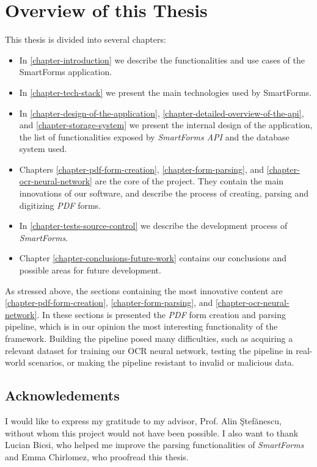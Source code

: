 \documentclass[11pt, a4paper]{report}
\begin{document}
\section{Overview of this Thesis}

This thesis is divided into several chapters:
\begin{itemize}
	\item In \autoref{chapter-introduction} we describe the functionalities and use cases of the SmartForms application.
	\item In \autoref{chapter-tech-stack} we present the main technologies used by SmartForms.
	\item In \autoref{chapter-design-of-the-application}, \autoref{chapter-detailed-overview-of-the-api}, and \autoref{chapter-storage-system} we present the internal design of the application, the list of functionalities exposed by \textit{SmartForms API} and the database system used.
	\item Chapters \ref{chapter-pdf-form-creation}, \ref{chapter-form-parsing}, and \ref{chapter-ocr-neural-network} are the core of the project. They contain the main innovations of our software, and describe the process of creating, parsing and digitizing \textit{PDF} forms.
	\item In \autoref{chapter-tests-source-control} we describe the development process of \textit{SmartForms}.
	\item Chapter \ref{chapter-conclusions-future-work} contains our conclusions and possible areas for future development.
\end{itemize}

As stressed above, the sections containing the most innovative content are  \autoref{chapter-pdf-form-creation}, \autoref{chapter-form-parsing}, and \autoref{chapter-ocr-neural-network}. In these sections is presented the \textit{PDF} form creation and parsing pipeline, which is in our opinion the most interesting functionality of the framework. Building the pipeline posed many difficulties, such as acquiring a relevant dataset for training our OCR neural network, testing the pipeline in real-world scenarios, or making the pipeline resistant to invalid or malicious data. 


\subsection{Acknowledements}

I would like to express my gratitude to my advisor, Prof. Alin \c Stef\u anescu, without whom this project would not have been possible. I also want to thank Lucian Bicsi, who helped me improve the parsing functionalities of \textit{SmartForms} and Emma Chirlomez, who proofread this thesis.
\end{document}
